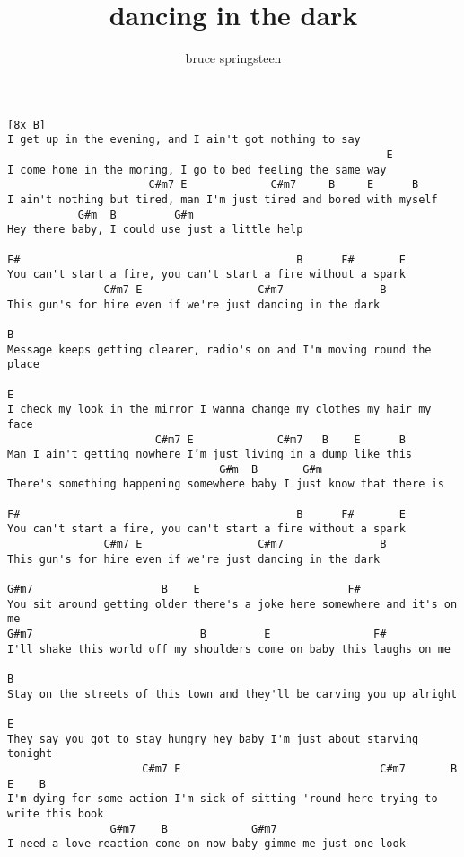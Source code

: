 \author{bruce springsteen}
\title{dancing in the dark}
\maketitle
\begin{verbatim}
[8x B]
I get up in the evening, and I ain't got nothing to say
                                                           E
I come home in the moring, I go to bed feeling the same way
                      C#m7 E             C#m7     B     E      B
I ain't nothing but tired, man I'm just tired and bored with myself
           G#m  B         G#m
Hey there baby, I could use just a little help

F#                                           B      F#       E
You can't start a fire, you can't start a fire without a spark
               C#m7 E                  C#m7               B
This gun's for hire even if we're just dancing in the dark

B        
Message keeps getting clearer, radio's on and I'm moving round the place
                                                                       E
I check my look in the mirror I wanna change my clothes my hair my face
                       C#m7 E             C#m7   B    E      B
Man I ain't getting nowhere I’m just living in a dump like this
                                 G#m  B       G#m
There's something happening somewhere baby I just know that there is

F#                                           B      F#       E
You can't start a fire, you can't start a fire without a spark
               C#m7 E                  C#m7               B
This gun's for hire even if we're just dancing in the dark

G#m7                    B    E                       F#
You sit around getting older there's a joke here somewhere and it's on me
G#m7                          B         E                F#
I'll shake this world off my shoulders come on baby this laughs on me

B
Stay on the streets of this town and they'll be carving you up alright
                                                                       E
They say you got to stay hungry hey baby I'm just about starving tonight
                     C#m7 E                               C#m7       B    E    B
I'm dying for some action I'm sick of sitting 'round here trying to write this book
                G#m7    B             G#m7
I need a love reaction come on now baby gimme me just one look


\end{verbatim}
